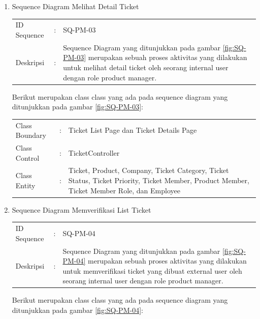 \documentclass[12pt]{article}
\begin{document}
\begin{enumerate}[label=\textbf{4.\arabic*.}]
\begin{enumerate} [label=\textbf{4.2.\arabic*.}, wide, labelwidth=!, labelindent=0pt]
\begin{enumerate}[label=\textbf{4.2.2.\arabic*.}, wide, labelwidth=!, labelindent=0pt]
\begin{enumerate}[label=\arabic*.]
\begin{tabularx}{.9\linewidth}{@{} l l X @{}}
                \end{tabularx}

                
                \item Sequence Diagram Melihat Detail Ticket
                
                \begin{tabularx}{.9\linewidth}{@{} l l X @{}}
                    ID Sequence &	: & SQ-PM-03 \\
                    Deskripsi &	: & Sequence Diagram yang ditunjukkan pada gambar \ref{fig:SQ-PM-03} merupakan sebuah proses aktivitas yang dilakukan untuk melihat detail ticket oleh seorang internal user dengan role product manager. 
        
                \end{tabularx}

                \noindent Berikut merupakan class class yang ada pada sequence diagram yang ditunjukkan pada gambar \ref{fig:SQ-PM-03}:

                \begin{tabularx}{.9\linewidth}{@{} l l X @{}}
                    Class Boundary & : & Ticket List Page dan Ticket Details Page\\
                    Class Control & : & TicketController \\
                    Class Entity & : & Ticket, Product, Company, Ticket Category, Ticket Status, Ticket Priority, Ticket Member, Product Member, Ticket Member Role, dan Employee
                
                \end{tabularx}
                
                \item Sequence Diagram Memverifikasi List Ticket
                
                \begin{tabularx}{.9\linewidth}{@{} l l X @{}}
                    ID Sequence &	: & SQ-PM-04 \\
                    Deskripsi &	: & Sequence Diagram yang ditunjukkan pada gambar \ref{fig:SQ-PM-04}  merupakan sebuah proses aktivitas yang dilakukan untuk memverifikasi ticket yang dibuat external user oleh seorang internal user dengan role product manager. 
        
                \end{tabularx}

                \noindent Berikut merupakan class class yang ada pada sequence diagram yang ditunjukkan pada gambar \ref{fig:SQ-PM-04}:


\end{enumerate}
\end{enumerate}
\end{enumerate}
\end{enumerate}
\end{document}
